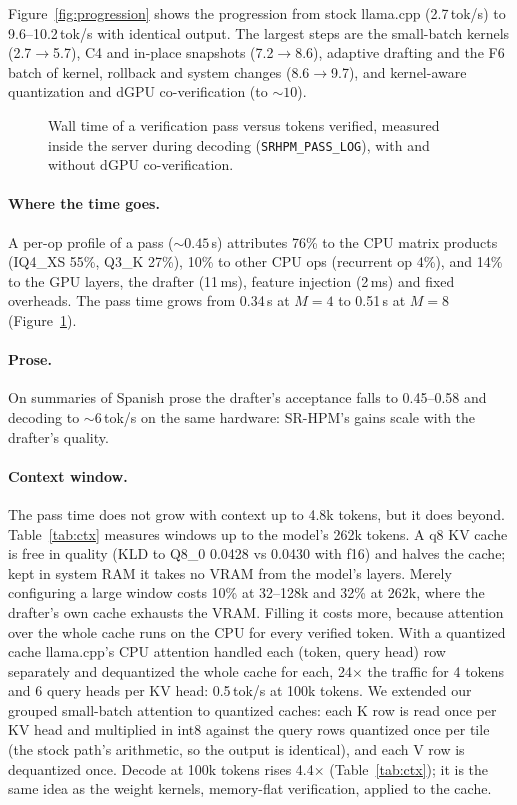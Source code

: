 \documentclass[10pt]{article}
\newcommand{\tps}{tok/s}
\begin{document}
Figure~\ref{fig:progression} shows the progression from stock llama.cpp (2.7\,\tps) to 9.6--10.2\,\tps{} with
identical output. The largest steps are the small-batch kernels (2.7$\to$5.7), C4 and in-place snapshots
(7.2$\to$8.6), adaptive drafting and the F6 batch of kernel, rollback and system changes (8.6$\to$9.7), and
kernel-aware quantization and dGPU co-verification (to ${\sim}10$).

\begin{figure}[t]
\centering

\caption{Wall time of a verification pass versus tokens verified, measured inside the server during decoding
(\texttt{SRHPM\_PASS\_LOG}), with and without dGPU co-verification.}
\label{fig:cost}
\end{figure}

\paragraph{Where the time goes.} A per-op profile of a pass (${\sim}0.45$\,s) attributes 76\% to the CPU matrix
products (IQ4\_XS 55\%, Q3\_K 27\%), 10\% to other CPU ops (recurrent op 4\%), and 14\% to the GPU layers, the
drafter (11\,ms), feature injection (2\,ms) and fixed overheads. The pass time grows from 0.34\,s at $M=4$ to
0.51\,s at $M=8$ (Figure~\ref{fig:cost}).

\paragraph{Prose.} On summaries of Spanish prose the drafter's acceptance falls to 0.45--0.58 and decoding to
${\sim}6$\,\tps{} on the same hardware: SR-HPM's gains scale with the drafter's quality.

\paragraph{Context window.} The pass time does not grow with context up to 4.8k tokens, but it does beyond.
Table~\ref{tab:ctx} measures windows up to the model's 262k tokens. A q8 KV cache is free in quality (KLD to Q8\_0
0.0428 vs 0.0430 with f16) and halves the cache; kept in system RAM it takes no VRAM from the model's layers. Merely
configuring a large window costs 10\% at 32--128k and 32\% at 262k, where the drafter's own cache exhausts the VRAM.
Filling it costs more, because attention over the whole cache runs on the CPU for every verified token.
With a quantized cache llama.cpp's CPU attention handled each (token, query head) row separately and dequantized the
whole cache for each, 24$\times$ the traffic for 4 tokens and 6 query heads per KV head: 0.5\,\tps{} at 100k tokens.
We extended our grouped small-batch attention to quantized caches: each K row is read once per KV head and multiplied
in int8 against the query rows quantized once per tile (the stock path's arithmetic, so the output is identical), and
each V row is dequantized once. Decode at 100k tokens rises 4.4$\times$ (Table~\ref{tab:ctx}); it is the same idea as
the weight kernels, memory-flat verification, applied to the cache.
\end{document}
